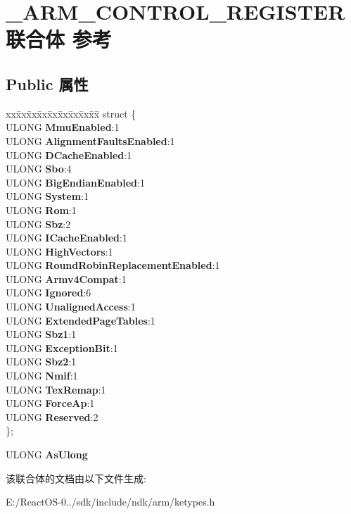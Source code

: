 \hypertarget{union___a_r_m___c_o_n_t_r_o_l___r_e_g_i_s_t_e_r}{}\section{\+\_\+\+A\+R\+M\+\_\+\+C\+O\+N\+T\+R\+O\+L\+\_\+\+R\+E\+G\+I\+S\+T\+E\+R联合体 参考}
\label{union___a_r_m___c_o_n_t_r_o_l___r_e_g_i_s_t_e_r}
\subsection*{Public 属性}
\begin{DoxyCompactItemize}
\item 
\mbox{\label{union___a_r_m___c_o_n_t_r_o_l___r_e_g_i_s_t_e_r_a88c4eeaa79fcc2edddbe9f1badf1180c}} 
\begin{tabbing}
xx\=xx\=xx\=xx\=xx\=xx\=xx\=xx\=xx\=\kill
struct \{\\
\>ULONG {\bfseries MmuEnabled}:1\\
\>ULONG {\bfseries AlignmentFaultsEnabled}:1\\
\>ULONG {\bfseries DCacheEnabled}:1\\
\>ULONG {\bfseries Sbo}:4\\
\>ULONG {\bfseries BigEndianEnabled}:1\\
\>ULONG {\bfseries System}:1\\
\>ULONG {\bfseries Rom}:1\\
\>ULONG {\bfseries Sbz}:2\\
\>ULONG {\bfseries ICacheEnabled}:1\\
\>ULONG {\bfseries HighVectors}:1\\
\>ULONG {\bfseries RoundRobinReplacementEnabled}:1\\
\>ULONG {\bfseries Armv4Compat}:1\\
\>ULONG {\bfseries Ignored}:6\\
\>ULONG {\bfseries UnalignedAccess}:1\\
\>ULONG {\bfseries ExtendedPageTables}:1\\
\>ULONG {\bfseries Sbz1}:1\\
\>ULONG {\bfseries ExceptionBit}:1\\
\>ULONG {\bfseries Sbz2}:1\\
\>ULONG {\bfseries Nmif}:1\\
\>ULONG {\bfseries TexRemap}:1\\
\>ULONG {\bfseries ForceAp}:1\\
\>ULONG {\bfseries Reserved}:2\\
\}; \\

\end{tabbing}\item 
\mbox{\label{union___a_r_m___c_o_n_t_r_o_l___r_e_g_i_s_t_e_r_afddff2e25f033a62b55d7a0144ec42b7}} 
U\+L\+O\+NG {\bfseries As\+Ulong}
\end{DoxyCompactItemize}


该联合体的文档由以下文件生成\+:\begin{DoxyCompactItemize}
\item 
E\+:/\+React\+O\+S-\/0../sdk/include/ndk/arm/ketypes.\+h\end{DoxyCompactItemize}
